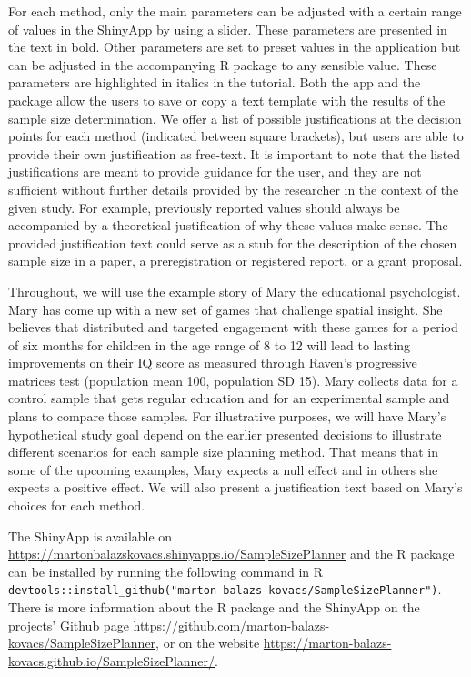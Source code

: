 \documentclass[
  english,
  man,floatsintext]{apa6}
\begin{document}
For each method, only the main parameters can be adjusted with a certain range of values in the ShinyApp by using a slider. These parameters are presented in the text in bold. Other parameters are set to preset values in the application but can be adjusted in the accompanying R package to any sensible value. These parameters are highlighted in italics in the tutorial. Both the app and the package allow the users to save or copy a text template with the results of the sample size determination. We offer a list of possible justifications at the decision points for each method (indicated between square brackets), but users are able to provide their own justification as free-text. It is important to note that the listed justifications are meant to provide guidance for the user, and they are not sufficient without further details provided by the researcher in the context of the given study. For example, previously reported values should always be accompanied by a theoretical justification of why these values make sense. The provided justification text could serve as a stub for the description of the chosen sample size in a paper, a preregistration or registered report, or a grant proposal.

Throughout, we will use the example story of Mary the educational psychologist. Mary has come up with a new set of games that challenge spatial insight. She believes that distributed and targeted engagement with these games for a period of six months for children in the age range of 8 to 12 will lead to lasting improvements on their IQ score as measured through Raven's progressive matrices test (population mean 100, population SD 15). Mary collects data for a control sample that gets regular education and for an experimental sample and plans to compare those samples. For illustrative purposes, we will have Mary's hypothetical study goal depend on the earlier presented decisions to illustrate different scenarios for each sample size planning method. That means that in some of the upcoming examples, Mary expects a null effect and in others she expects a positive effect. We will also present a justification text based on Mary's choices for each method.

The ShinyApp is available on \url{https://martonbalazskovacs.shinyapps.io/SampleSizePlanner} and the R package can be installed by running the following command in R \texttt{devtools::install\_github("marton-balazs-kovacs/SampleSizePlanner")}. There is more information about the R package and the ShinyApp on the projects' Github page \url{https://github.com/marton-balazs-kovacs/SampleSizePlanner}, or on the website \url{https://marton-balazs-kovacs.github.io/SampleSizePlanner/}.
\end{document}
